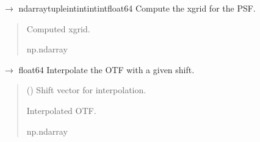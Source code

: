 \documentclass[letterpaper,10pt,english]{sphinxmanual}
\begin{document}
\begin{fulllineitems}
\begin{fulllineitems}
\end{fulllineitems}


\begin{fulllineitems}
\label{\detokenize{source/OpticalSystems:OpticalSystems.OpticalSystem3D.compute_x_grid}}
\pysigstartsignatures
\pysiglinewithargsret
{}
{}
{{ $\rightarrow$ ndarray\DUrole{p}{{[}}tuple\DUrole{p}{{[}}intintintint\DUrole{p}{{]}}float64\DUrole{p}{{]}}}}
\pysigstopsignatures
\sphinxAtStartPar
Compute the x\sphinxhyphen{}grid for the PSF.
\begin{quote}\begin{description}
\sphinxAtStartPar
Computed x\sphinxhyphen{}grid.

\sphinxAtStartPar
np.ndarray

\end{description}\end{quote}

\end{fulllineitems}


\begin{fulllineitems}
\label{\detokenize{source/OpticalSystems:OpticalSystems.OpticalSystem3D.interpolate_otf}}
\pysigstartsignatures
\pysiglinewithargsret
{}
{}
{{ $\rightarrow$ float64}}
\pysigstopsignatures
\sphinxAtStartPar
Interpolate the OTF with a given shift.
\begin{quote}\begin{description}
\sphinxAtStartPar
{} () \textendash{} Shift vector for interpolation.

\sphinxAtStartPar
Interpolated OTF.

\sphinxAtStartPar
np.ndarray


\end{description}
\end{quote}
\end{fulllineitems}
\end{fulllineitems}
\end{document}
